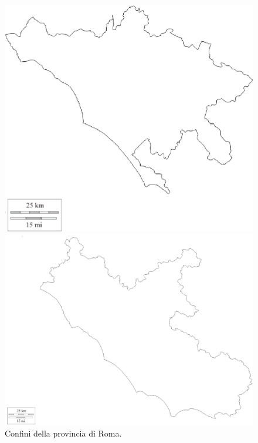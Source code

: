 \begin{enumerate}
	\begin{figure}[h]
		\hspace{0.02\linewidth}
		\begin{minipage}[t]{0.3\linewidth}
			\centering
			\includegraphics[width=1\textwidth]{images/roma}
			\caption{Confini della provincia di Roma.}
			\label{RomaBoundary}
		\end{minipage}
		\hspace{0.03\linewidth}
		\begin{minipage}[t]{0.3\linewidth}
			\centering
			\includegraphics[width=1\textwidth]{images/lazio}

\end{minipage}
\end{figure}
\end{enumerate}
